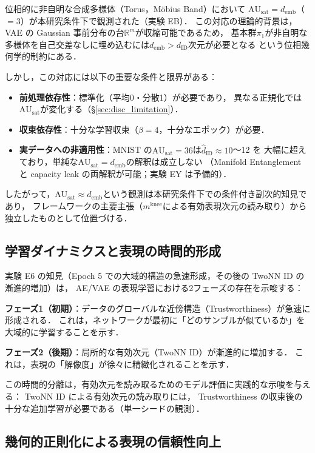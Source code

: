 \documentclass[11pt,a4paper]{jsarticle}
\newcommand{\dID}{d_{\mathrm{ID}}}
\newcommand{\R}{\mathbb{R}}
\newcommand{\AUsat}{\mathrm{AU}_{\mathrm{sat}}}
\newcommand{\mknee}{m^{\mathrm{knee}}}
\newcommand{\demb}{d_{\mathrm{emb}}}
\begin{document}
位相的に非自明な合成多様体（Torus，Möbius Band）において
$\AUsat = \demb$（$= 3$）が本研究条件下で観測された（実験 EB）．
この対応の理論的背景は，VAE の Gaussian 事前分布の台$\R^m$が収縮可能であるため，
基本群$\pi_1$が非自明な多様体を自己交差なしに埋め込むには$\demb > \dID$次元が必要となる
という位相幾何学的制約\cite{hatcher2002algebraic,guillemin1974differential}にある．

しかし，この対応には以下の重要な条件と限界がある：
\begin{itemize}
  \item \textbf{前処理依存性}：標準化（平均0・分散1）が必要であり，
        異なる正規化では$\AUsat$が変化する（§\ref{sec:disc_limitation}）．
  \item \textbf{収束依存性}：十分な学習収束（$\beta = 4$，十分なエポック）が必要．
  \item \textbf{実データへの非適用性}：MNIST の$\AUsat = 36$は$\hat{d}_\mathrm{ID} \approx 10$〜12 を
        大幅に超えており，単純な$\AUsat = \demb$の解釈は成立しない
        （Manifold Entanglement と capacity leak の両解釈が可能；実験 EY は予備的）．
\end{itemize}

したがって，$\AUsat \approx \demb$という観測は本研究条件下での条件付き副次的知見であり，
フレームワークの主要主張（$\mknee$による有効表現次元の読み取り）から独立したものとして位置づける．

\subsection{学習ダイナミクスと表現の時間的形成}\label{sec:disc_dynamics}

実験 E6 の知見（Epoch 5 での大域的構造の急速形成，その後の TwoNN ID の漸進的増加）は，
AE/VAE の表現学習における2フェーズの存在を示唆する：

\textbf{フェーズ1（初期）}：データのグローバルな近傍構造（Trustworthiness）が急速に形成される．
これは，ネットワークが最初に「どのサンプルが似ているか」を大域的に学習することを示す．

\textbf{フェーズ2（後期）}：局所的な有効次元（TwoNN ID）が漸進的に増加する．
これは，表現の「解像度」が徐々に精緻化されることを示す．

この時間的分離は，有効次元を読み取るためのモデル評価に実践的な示唆を与える：
TwoNN ID による有効次元の読み取りには，
Trustworthiness の収束後の十分な追加学習が必要である（単一シードの観測）．

\subsection{幾何的正則化による表現の信頼性向上}\label{sec:disc_isometric}
\end{document}
